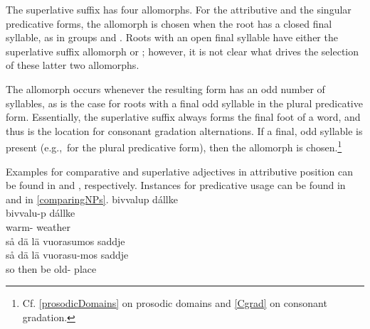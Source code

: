 The superlative suffix has four allomorphs. For the attributive and the singular predicative forms, the allomorph  is chosen when the root has a closed final syllable, as in groups  and . Roots with an open final syllable have either the superlative suffix allomorph  or ; however, it is not clear what drives the selection of these latter two allomorphs. 

The allomorph  occurs whenever the resulting form has an odd number of syllables, as is the case for roots with a final odd syllable in the plural predicative form. %
Essentially, the superlative suffix always forms the final foot of a word, and thus is the location for consonant gradation alternations. If a final, odd syllable is present (e.g.,~for the plural predicative form), then the \mbox{} allomorph is chosen.\footnote{Cf. \SEC\ref{prosodicDomains} on prosodic domains and \SEC\ref{Cgrad} on consonant gradation.} 

Examples for comparative and superlative adjectives in attributive position can be found in  and , respectively. Instances for predicative usage can be found in  and  in \SEC\ref{comparingNPs}.
\ea\label{compATTRADJex1}
\glll	bivvalup dállke\\
	bivvalu-p dállke\\
	warm- weather\BS{}\\
{}	
\z
\ea\label{superlATTRADJex1}%
\glll	så dä lä vuorasumos saddje\\
	så dä lä vuorasu-mos saddje\\
	so then be\BS{} old- place\BS{}\\
{}	
\z

